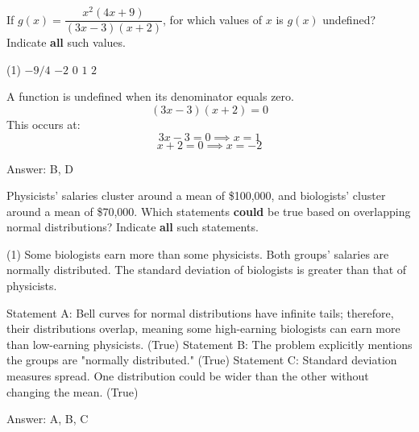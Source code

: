 \documentclass[11pt,paper=a4,answers]{exam}
\begin{document}
\begin{questions}

\question
If $g(x) = \dfrac{x^2(4x + 9)}{(3x - 3)(x + 2)}$, for which values of $x$ is $g(x)$ undefined?
Indicate \textbf{all} such values.

\begin{tasks}(1)
\task[A)] $-9/4$ \task[B)] $-2$ \task[C)] $0$ \task[D)] $1$ \task[E)] $2$
\end{tasks}

\begin{solution}
A function is undefined when its denominator equals zero.
\vspace{5pt}
\[ (3x - 3)(x + 2) = 0 \]
\vspace{5pt}
This occurs at:
\vspace{5pt}
\[ 3x - 3 = 0 \implies x = 1 \]
\vspace{5pt}
\[ x + 2 = 0 \implies x = -2 \]

Answer: \colorbox{yellow!100}{B, D}
\end{solution}

\vspace{1cm}

\question
Physicists' salaries cluster around a mean of \$100,000, and biologists' cluster around a mean of \$70,000. Which statements \textbf{could} be true based on overlapping normal distributions?
Indicate \textbf{all} such statements.

\begin{tasks}(1)
\task[A)] Some biologists earn more than some physicists.
\task[B)] Both groups' salaries are normally distributed.
\task[C)] The standard deviation of biologists is greater than that of physicists.
\end{tasks}

\begin{solution}
Statement A: Bell curves for normal distributions have infinite tails; therefore, their distributions overlap, meaning some high-earning biologists can earn more than low-earning physicists. (True)
\vspace{5pt}
Statement B: The problem explicitly mentions the groups are "normally distributed." (True)
\vspace{5pt}
Statement C: Standard deviation measures spread. One distribution could be wider than the other without changing the mean. (True)

Answer: \colorbox{yellow!100}{A, B, C}
\end{solution}

\vspace{1cm}


\end{questions}
\end{document}
